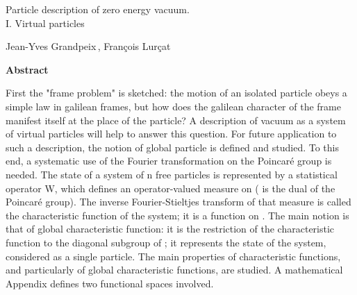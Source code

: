 \documentclass[a4paper,11pt]{article}
\begin{document}

\begin{center}

\vspace*{2cm}

\LARGE{Particle description of zero energy vacuum.\\
        I. Virtual particles}

\vspace{5mm}

\normalsize{Jean-Yves Grandpeix\,\footnotemark[1], Fran\c{c}ois Lur\c{c}at\,\footnotemark[2]}

\vspace{3cm}


{\bf Abstract}
\end{center}

\medskip


First the "frame problem" is sketched: the motion of an isolated particle obeys a simple law in 
galilean frames, but how does the galilean character of the frame manifest itself at the place 
of the particle? A description of vacuum as a system of virtual particles will help to answer 
this question. For future application to such a description, the notion of global particle is 
defined and studied. To this end, a systematic use of the Fourier transformation on the 
Poincar\'e  group is needed. The state of a system of n free particles is represented by a 
statistical operator W, which defines an operator-valued measure on \coordHE{} (\myHighlight{$\Pc$}\coordHE{} is the 
dual 
of the Poincar\'e  group). The inverse Fourier-Stieltjes transform of that measure is called the 
characteristic function of the system; it is a function on \coordHE{}. The main notion is that of 
global characteristic function: it is the restriction of the characteristic function to the 
diagonal subgroup of \coordHE{}; it represents the state of the system, considered as a single 
particle. The main properties of characteristic functions, and particularly of global 
characteristic functions, are studied. A mathematical Appendix defines two functional spaces 
involved.


\end{document}
